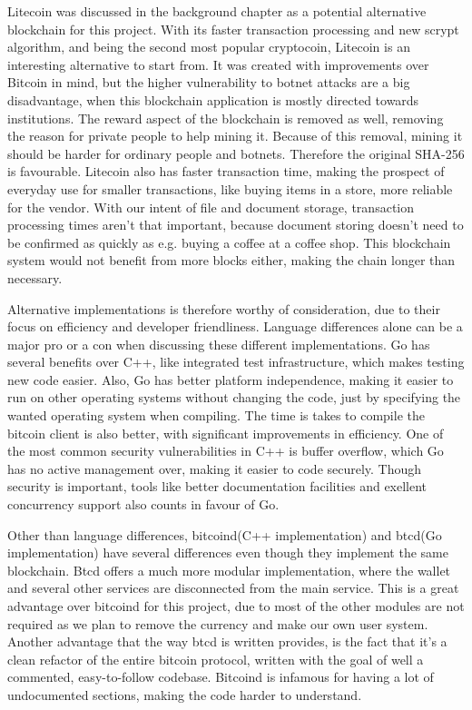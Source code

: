 \documentclass[12pt]{article}
\begin{document}
Litecoin was discussed in the background chapter as a potential alternative blockchain for this project. With its faster transaction processing and new scrypt algorithm, and being the second most popular cryptocoin, Litecoin is an interesting alternative to start from. It was created with improvements over Bitcoin in mind, but the higher vulnerability to botnet attacks are a big disadvantage, when this blockchain application is mostly directed towards institutions. The reward aspect of the blockchain is removed as well, removing the reason for private people to help mining it. Because of this removal, mining it should be harder for ordinary people and botnets. Therefore the original SHA-256 is favourable. Litecoin also has faster transaction time, making the prospect of everyday use for smaller transactions, like buying items in a store, more reliable for the vendor. With our intent of file and document storage, transaction processing times aren't that important, because document storing doesn't need to be confirmed as quickly as e.g. buying a coffee at a coffee shop. This blockchain system would not benefit from more blocks either, making the chain longer than necessary. 

Alternative implementations is therefore worthy of consideration, due to their focus on efficiency and developer friendliness. Language differences alone can be a major pro or a con when discussing these different implementations. Go has several benefits over C++, like integrated test infrastructure, which makes testing new code easier. Also, Go has better platform independence, making it easier to run on other operating systems without changing the code, just by specifying the wanted operating system when compiling. The time is takes to compile the bitcoin client is also better, with significant improvements in efficiency. One of the most common security vulnerabilities in C++ is buffer overflow, which Go has no active management over, making it easier to code securely. Though security is important, tools like better documentation facilities and exellent concurrency support also counts in favour of Go. 

Other than language differences, bitcoind(C++ implementation) and btcd(Go implementation)
have several differences even though they implement the same blockchain. Btcd offers a much more modular implementation, where the wallet and several other services are disconnected from the main service. This is a great advantage over bitcoind for this project, due to most of the other modules are not required as we plan to remove the currency and make our own user system. Another advantage that the way btcd is written provides, is the fact that it's a clean refactor of the entire bitcoin protocol, written with the goal of well a commented, easy-to-follow codebase. Bitcoind is infamous for having a lot of undocumented sections, making the code harder to understand. 
\end{document}
